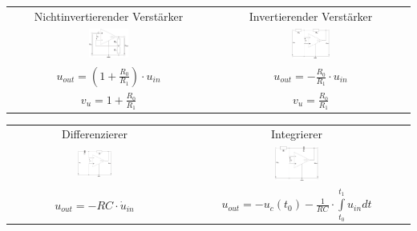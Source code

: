 \documentclass[a4paper,twocolumn,10pt]{article}
\begin{document}
\begin{tabular}{c|c}
	Nichtinvertierender Verstärker & Invertierender Verstärker\\
	\includegraphics[width=0.2\textwidth]{Grafiken/OP_NiV} &
	\includegraphics[width=0.2\textwidth]{Grafiken/OP_IV}\\
	$u_{out}=(1+\frac{R_0}{R_1})\cdot u_{in}$ & $u_{out}=-\frac{R_0}{R_1}\cdot u_{in}$\\
	$v_u=1+\frac{R_0}{R_1}$ & $v_u=\frac{R_0}{R_1}$
\end{tabular}


\begin{tabular}{c|c}
	Differenzierer & Integrierer\\
	\includegraphics[width=0.2\textwidth]{Grafiken/OP_Diff} & \includegraphics[width=0.2\textwidth]{Grafiken/OP_Int}\\
	$u_{out}=-RC\cdot \dot{u}_{in}$ & 
	$u_{out}=-u_c(t_0)-\frac{1}{RC}\cdot \int\limits_{t_0}^{t_1}u_{in}dt$
\end{tabular}
\end{document}
